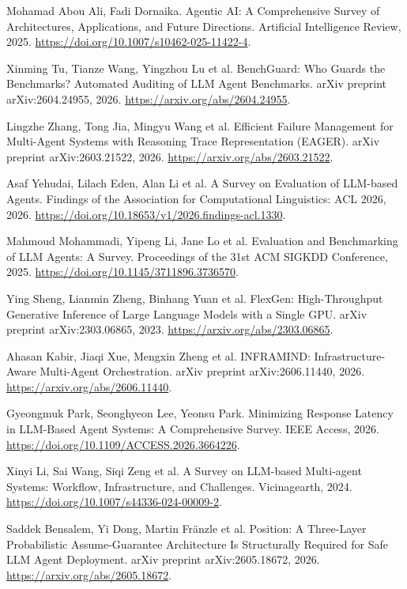  Mohamad Abou Ali, Fadi Dornaika. Agentic {AI}: A Comprehensive Survey of Architectures, Applications, and Future Directions. Artificial Intelligence Review, 2025. \url{https://doi.org/10.1007/s10462-025-11422-4}.

 Xinming Tu, Tianze Wang, Yingzhou Lu et al. {BenchGuard}: Who Guards the Benchmarks? Automated Auditing of {LLM} Agent Benchmarks. arXiv preprint arXiv:2604.24955, 2026. \url{https://arxiv.org/abs/2604.24955}.

 Lingzhe Zhang, Tong Jia, Mingyu Wang et al. Efficient Failure Management for Multi-Agent Systems with Reasoning Trace Representation ({EAGER}). arXiv preprint arXiv:2603.21522, 2026. \url{https://arxiv.org/abs/2603.21522}.

 Asaf Yehudai, Lilach Eden, Alan Li et al. A Survey on Evaluation of {LLM}-based Agents. Findings of the Association for Computational Linguistics: ACL 2026, 2026. \url{https://doi.org/10.18653/v1/2026.findings-acl.1330}.

 Mahmoud Mohammadi, Yipeng Li, Jane Lo et al. Evaluation and Benchmarking of {LLM} Agents: A Survey. Proceedings of the 31st ACM SIGKDD Conference, 2025. \url{https://doi.org/10.1145/3711896.3736570}.

 Ying Sheng, Lianmin Zheng, Binhang Yuan et al. {FlexGen}: High-Throughput Generative Inference of Large Language Models with a Single {GPU}. arXiv preprint arXiv:2303.06865, 2023. \url{https://arxiv.org/abs/2303.06865}.

 Ahasan Kabir, Jiaqi Xue, Mengxin Zheng et al. {INFRAMIND}: Infrastructure-Aware Multi-Agent Orchestration. arXiv preprint arXiv:2606.11440, 2026. \url{https://arxiv.org/abs/2606.11440}.

 Gyeongmuk Park, Seonghyeon Lee, Yeonsu Park. Minimizing Response Latency in {LLM}-Based Agent Systems: A Comprehensive Survey. IEEE Access, 2026. \url{https://doi.org/10.1109/ACCESS.2026.3664226}.

 Xinyi Li, Sai Wang, Siqi Zeng et al. A Survey on {LLM}-based Multi-agent Systems: Workflow, Infrastructure, and Challenges. Vicinagearth, 2024. \url{https://doi.org/10.1007/s44336-024-00009-2}.

 Saddek Bensalem, Yi Dong, Martin Fränzle et al. Position: A Three-Layer Probabilistic Assume-Guarantee Architecture Is Structurally Required for Safe {LLM} Agent Deployment. arXiv preprint arXiv:2605.18672, 2026. \url{https://arxiv.org/abs/2605.18672}.

